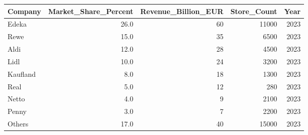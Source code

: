 \begin{tabular}{lrrrr}
\toprule
Company & Market_Share_Percent & Revenue_Billion_EUR & Store_Count & Year \\
\midrule
Edeka & 26.0 & 60 & 11000 & 2023 \\
Rewe & 15.0 & 35 & 6500 & 2023 \\
Aldi & 12.0 & 28 & 4500 & 2023 \\
Lidl & 10.0 & 24 & 3200 & 2023 \\
Kaufland & 8.0 & 18 & 1300 & 2023 \\
Real & 5.0 & 12 & 280 & 2023 \\
Netto & 4.0 & 9 & 2100 & 2023 \\
Penny & 3.0 & 7 & 2200 & 2023 \\
Others & 17.0 & 40 & 15000 & 2023 \\
\bottomrule
\end{tabular}
